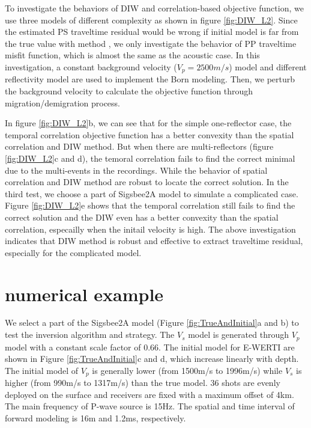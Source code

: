 To investigate the behaviors of DIW and correlation-based objective function, we use three 
models of different complexity as shown in figure \ref{fig:DIW_L2}. Since the estimated PS
traveltime residual would be wrong if initial model is far from the true value with method , 
we only investigate the behavior of PP traveltime misfit
function, which is almost the same as the acoustic case. 
In this investigation, a constant background velocity ($V_p=2500m/s$) model and different reflectivity model
are used to implement the Born modeling. Then, we perturb the background velocity to calculate the
objective function through migration/demigration process. 

In figure \ref{fig:DIW_L2}b, we can see that for the simple one-reflector case, the temporal correlation objective function 
has a better convexity than the spatial correlation and DIW method. But when there are
multi-reflectors (figure \ref{fig:DIW_L2}c and d), the temoral correlation fails to find the correct minimal due to the
multi-events in the recordings. While the behavior of spatial correlation and DIW method are
robust to locate the correct solution. In the third test, we choose a part of Sigsbee2A model to
simulate a complicated case. Figure \ref{fig:DIW_L2}e shows that the temporal correlation still
fails to find the correct solution and the DIW even has a better convexity than the spatial
correlation, especailly when the initail velocity is high. The above investigation indicates that
DIW method is robust and effective to extract traveltime residual, especially for the complicated
model.
\section{numerical example}
We select a part of the Sigsbee2A model (Figure
\ref{fig:TrueAndInitial}a and b) to test the inversion algorithm and strategy.
The $V_s$ model is generated through $V_p$ model with a constant scale factor of 0.66. 
The initial model for E-WERTI are shown in 
Figure \ref{fig:TrueAndInitial}c and d, which increase linearly with depth.
The initial model of $V_p$ is generally lower (from 1500m/s to 1996m/s) while 
$V_s$ is higher  (from 990m/s to 1317m/s) than the true model. 
36 shots are evenly deployed on the surface and receivers are
fixed with a maximum offset of 4km. 
The main frequency of P-wave source is 15Hz.
The spatial and time interval of forward modeling is 16m and 1.2ms, respectively.

